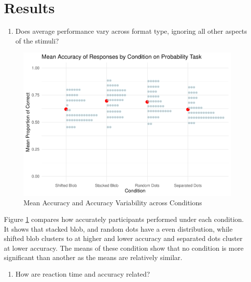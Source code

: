 \documentclass[
  man,floatsintext]{apa6}
\providecommand{\tightlist}{%
  \setlength{\itemsep}{0pt}\setlength{\parskip}{0pt}}
\begin{document}
\section{Results}\label{results}

\begin{enumerate}
\def\labelenumi{\arabic{enumi}.}
\tightlist
\item
  Does average performance vary across format type, ignoring all other aspects of the stimuli?
\end{enumerate}

\begin{figure}
\centering
\includegraphics{Espana_WA11_files/figure-latex/plot-one-1.pdf}
\caption{\label{fig:plot-one}Mean Accuracy and Accuracy Variability across Conditions}
\end{figure}

Figure \ref{fig:plot-one} compares how accurately participants performed under each condition. It shows that stacked blob, and random dots have a even distribution, while shifted blob clusters to at higher and lower accuracy and separated dots cluster at lower accuracy. The means of these condition show that no condition is more significant than another as the means are relatively similar.

\begin{enumerate}
\def\labelenumi{\arabic{enumi}.}
\setcounter{enumi}{1}
\tightlist
\item
  How are reaction time and accuracy related?
\end{enumerate}
\end{document}
